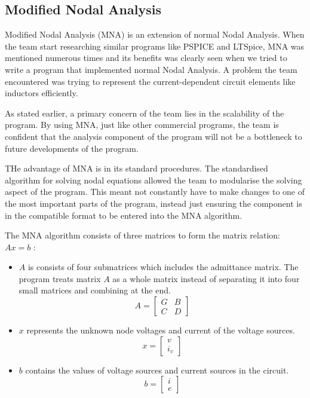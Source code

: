 \documentclass[12pt,a4paper]{article}
\begin{document}
	\subsection{Modified Nodal Analysis}
	Modified Nodal Analysis (MNA) is an extension of normal Nodal Analysis. When the team start researching similar 
	programs like PSPICE and LTSpice, MNA was mentioned numerous times \cite{MNA} and its benefits was clearly seen when we tried 
	to write a program that implemented normal Nodal Analysis. A problem the team encountered was trying to 
	represent the current-dependent circuit elements like inductors efficiently. 
	\par
	As stated earlier, a primary concern of the team lies in the scalability of the program. By using MNA, just like
	other commercial programs, the team is confident that the analysis component of the program will not be a 
	bottleneck to future developments of the program.
	\par
	THe advantage of MNA is in its standard procedures. The standardised algorithm for solving nodal 
	equations allowed the team to modularise the solving aspect of the program. This meant not constantly have to 
	make changes to one of the most important parts of the program, instead just ensuring the component is in the 
	compatible format to be entered into the MNA algorithm.
	\par 
	The MNA algorithm consists of three matrices to form the matrix relation: $Ax=b$ \cite{MNA}:
	\begin{itemize}
		\item $A$ is consists of four submatrices which includes the admittance matrix. The program treats matrix $A$ as 
		a whole matrix instead of separating it into four small matrices and combining at the end.
		$$ A =
		\begin{bmatrix}
			G & B\\
			C & D 
		\end{bmatrix} $$

		\item $x$ represents the unknown node voltages and current of the voltage sources.
		$$ x =
		\begin{bmatrix}
			v \\
			i_{v} 
		\end{bmatrix} $$

		\item $b$ contains the values of voltage sources and current sources in the circuit.
		$$ b =
		\begin{bmatrix}
			i \\
			e 
		\end{bmatrix} $$

	\end{itemize}
\end{document}
